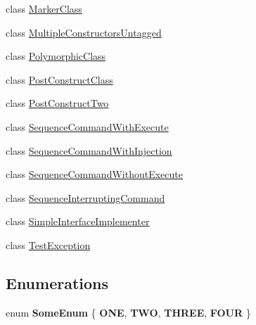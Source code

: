 \begin{DoxyCompactItemize}
\item 
class \hyperlink{classstrange_1_1unittests_1_1_marker_class}{Marker\-Class}
\item 
class \hyperlink{classstrange_1_1unittests_1_1_multiple_constructors_untagged}{Multiple\-Constructors\-Untagged}
\item 
class \hyperlink{classstrange_1_1unittests_1_1_polymorphic_class}{Polymorphic\-Class}
\item 
class \hyperlink{classstrange_1_1unittests_1_1_post_construct_class}{Post\-Construct\-Class}
\item 
class \hyperlink{classstrange_1_1unittests_1_1_post_construct_two}{Post\-Construct\-Two}
\item 
class \hyperlink{classstrange_1_1unittests_1_1_sequence_command_with_execute}{Sequence\-Command\-With\-Execute}
\item 
class \hyperlink{classstrange_1_1unittests_1_1_sequence_command_with_injection}{Sequence\-Command\-With\-Injection}
\item 
class \hyperlink{classstrange_1_1unittests_1_1_sequence_command_without_execute}{Sequence\-Command\-Without\-Execute}
\item 
class \hyperlink{classstrange_1_1unittests_1_1_sequence_interrupting_command}{Sequence\-Interrupting\-Command}
\item 
class \hyperlink{classstrange_1_1unittests_1_1_simple_interface_implementer}{Simple\-Interface\-Implementer}
\item 
class \hyperlink{classstrange_1_1unittests_1_1_test_exception}{Test\-Exception}
\end{DoxyCompactItemize}
\subsection*{Enumerations}
\begin{DoxyCompactItemize}
\item 
enum {\bfseries Some\-Enum} \{ {\bfseries O\-N\-E}, 
{\bfseries T\-W\-O}, 
{\bfseries T\-H\-R\-E\-E}, 
{\bfseries F\-O\-U\-R}
 \}
\end{DoxyCompactItemize}
